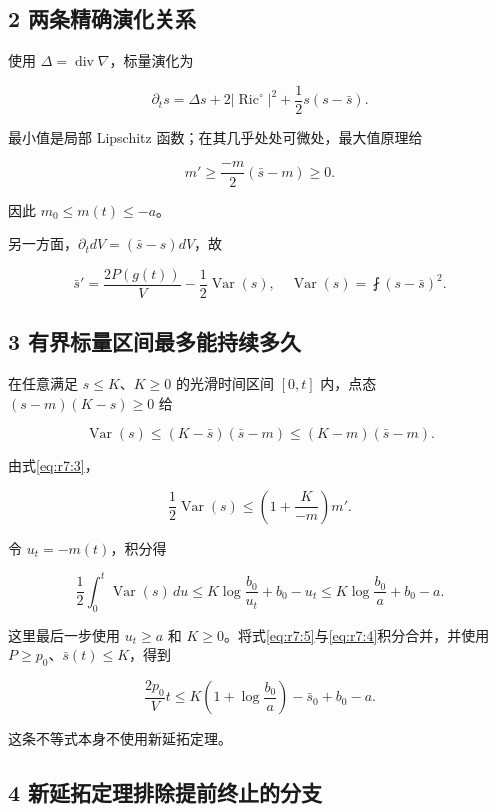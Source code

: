 \documentclass[UTF8,11pt,fontset=none]{ctexart}
\begin{document}
\subsection{2 两条精确演化关系}\label{ch7:ux4e24ux6761ux7cbeux786eux6f14ux5316ux5173ux7cfb}

使用 \(\Delta=\operatorname{div}\nabla\)，标量演化为

\[
 \partial_t s=\Delta s+2|\operatorname{Ric}^{\circ}|^2
             +\frac12s(s-\bar s).
\]

最小值是局部 Lipschitz 函数；在其几乎处处可微处，最大值原理给

\[
 m'\ge\frac{-m}{2}(\bar s-m)\ge0.
\tag{7.3}\label{eq:r7:3}
\]

因此 \(m_0\le m(t)\le-a\)。

另一方面，\(\partial_t dV=(\bar s-s)dV\)，故

\[
 \boxed{
 \bar s'=\frac{2P(g(t))}{V}-\frac12\operatorname{Var}(s),
 \quad \operatorname{Var}(s)=\fint(s-\bar s)^2.
 }
\tag{7.4}\label{eq:r7:4}
\]

\subsection{3 有界标量区间最多能持续多久}\label{ch7:ux6709ux754cux6807ux91cfux533aux95f4ux6700ux591aux80fdux6301ux7eedux591aux4e45}

在任意满足 \(s\le K\)、\(K\ge0\) 的光滑时间区间 \([0,t]\) 内，点态 \((s-m)(K-s)\ge0\) 给

\[
 \operatorname{Var}(s)\le(K-\bar s)(\bar s-m)
                      \le(K-m)(\bar s-m).
\]

由式\eqref{eq:r7:3}，

\[
 \frac12\operatorname{Var}(s)
 \le\left(1+\frac{K}{-m}\right)m'.
\]

令 \(u_t=-m(t)\)，积分得

\[
 \frac12\int_0^t\operatorname{Var}(s)\,du
 \le K\log\frac{b_0}{u_t}+b_0-u_t
 \le K\log\frac{b_0}{a}+b_0-a.
\tag{7.5}\label{eq:r7:5}
\]

这里最后一步使用 \(u_t\ge a\) 和 \(K\ge0\)。将式\eqref{eq:r7:5}与\eqref{eq:r7:4}积分合并，并使用 \(P\ge p_0\)、\(\bar s(t)\le K\)，得到

\[
 \boxed{
 \frac{2p_0}{V}t
 \le K\left(1+\log\frac{b_0}{a}\right)-\bar s_0+b_0-a.
 }
\tag{7.6}\label{eq:r7:6}
\]

这条不等式本身不使用新延拓定理。

\subsection{4 新延拓定理排除提前终止的分支}\label{ch7:ux65b0ux5ef6ux62d3ux5b9aux7406ux6392ux9664ux63d0ux524dux7ec8ux6b62ux7684ux5206ux652f}
\end{document}
